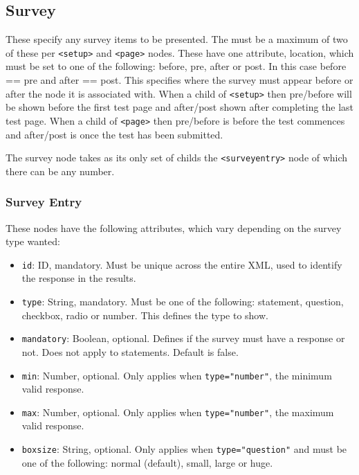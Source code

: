 \documentclass[11pt, oneside]{article}   	%
\begin{document}
    \subsection{Survey}
    \label{sec:survey}
        These specify any survey items to be presented. The must be a maximum of two of these per \texttt{<setup>} and \texttt{<page>} nodes. These have one attribute, location, which must be set to one of the following: before, pre, after or post. In this case before == pre and after == post. This specifies where the survey must appear before or after the node it is associated with. When a child of \texttt{<setup>} then pre/before will be shown before the first test page and after/post shown after completing the last test page. When a child of \texttt{<page>} then pre/before is before the test commences and after/post is once the test has been submitted.
        
        The survey node takes as its only set of childs the \texttt{<surveyentry>} node of which there can be any number.
        
        \subsubsection{Survey Entry}
        These nodes have the following attributes, which vary depending on the survey type wanted:
        \begin{itemize}
            \item \texttt{id}: ID, mandatory. Must be unique across the entire XML, used to identify the response in the results.
            \item \texttt{type}: String, mandatory. Must be one of the following: statement, question, checkbox, radio or number. This defines the type to show.
            \item \texttt{mandatory}: Boolean, optional. Defines if the survey must have a response or not. Does not apply to statements. Default is false.
            \item \texttt{min}: Number, optional. Only applies when \texttt{type="number"}, the minimum valid response.
            \item \texttt{max}: Number, optional. Only applies when \texttt{type="number"}, the maximum valid response.
            \item \texttt{boxsize}: String, optional. Only applies when \texttt{type="question"} and must be one of the following: normal (default), small, large or huge.
        \end{itemize}
\end{document}
